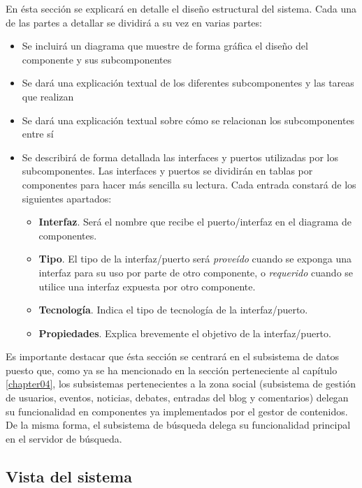 En ésta sección se explicará en detalle el diseño estructural del sistema.  Cada una de las partes a detallar se dividirá a su vez en varias partes:
\begin{itemize}
	\item Se incluirá un diagrama que muestre de forma gráfica el diseño del componente y sus subcomponentes
	\item Se dará una explicación textual de los diferentes subcomponentes y las tareas que realizan
	\item Se dará una explicación textual sobre cómo se relacionan los subcomponentes entre sí
	\item Se describirá de forma detallada las interfaces y puertos utilizadas por los subcomponentes.  Las interfaces y puertos se dividirán en tablas por componentes para hacer más sencilla su lectura.	Cada entrada constará de los siguientes apartados:
	\begin{itemize}
		\item \textbf{Interfaz}.  Será el nombre que recibe el puerto/interfaz en el diagrama de componentes.
		\item \textbf{Tipo}.  El tipo de la interfaz/puerto será \textit{proveído} cuando se exponga una interfaz para su uso por parte de otro componente, o \textit{requerido} cuando se utilice una interfaz expuesta por otro componente.
		\item \textbf{Tecnología}.  Indica el tipo de tecnología de la interfaz/puerto.
		\item \textbf{Propiedades}.  Explica brevemente el objetivo de la interfaz/puerto.
	\end{itemize}
\end{itemize}

Es importante destacar que ésta sección se centrará en el subsistema de datos puesto que, como ya se ha mencionado en la sección  perteneciente al capítulo \ref{chapter04}, los subsistemas pertenecientes a la zona social (subsistema de gestión de usuarios, eventos, noticias, debates, entradas del blog y comentarios) delegan su funcionalidad en componentes ya implementados por el gestor de contenidos.  De la misma forma, el subsistema de búsqueda delega su funcionalidad principal en el servidor de búsqueda.

\subsection{Vista del sistema}
\label{vista_sistema}



